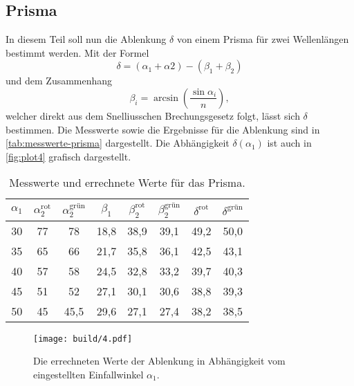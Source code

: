 \subsection{Prisma}
\label{sec:Prisma}
In diesem Teil soll nun die Ablenkung $\delta$ von einem Prisma für zwei Wellenlängen
bestimmt werden. Mit der Formel
\begin{equation}
	\delta = (\alpha_1 + \alpha2) - (\beta_1 + \beta_2)
\end{equation}
und dem Zusammenhang
\begin{equation}
	\beta_i = \arcsin\left(\frac{\sin\alpha_i}{n}\right),
\end{equation}
welcher direkt aus dem Snelliusschen Brechungsgesetz folgt, lässt sich $\delta$ bestimmen.
Die Messwerte sowie die Ergebnisse für die Ablenkung sind in \autoref{tab:messwerte-prisma}
dargestellt. Die Abhängigkeit $\delta(\alpha_1)$ ist auch in \autoref{fig:plot4} grafisch
dargestellt.
\begin{table}
	\centering
	\caption{Messwerte und errechnete Werte für das Prisma.}
	\label{tab:messwerte-prisma}
	\begin{tabular}{c c c c c c c c}
		\toprule
		$\alpha_1$ &
		$\alpha_2^\text{rot}$ &
		$\alpha_2^\text{grün}$ &
		$\beta_1$ &
		$\beta_2^\text{rot}$ &
		$\beta_2^\text{grün}$ &
		$\delta^\text{rot}$ &
		$\delta^\text{grün}$ \\
		\midrule
		30 & 77 & 78   & 18,8 & 38,9 & 39,1 & 49,2 & 50,0	\\
		35 & 65 & 66   & 21,7 & 35,8 & 36,1 & 42,5 & 43,1	\\
		40 & 57 & 58   & 24,5 & 32,8 & 33,2 & 39,7 & 40,3	\\
		45 & 51 & 52   & 27,1 & 30,1 & 30,6 & 38,8 & 39,3	\\
		50 & 45 & 45,5 & 29,6 & 27,1 & 27,4 & 38,2 & 38,5	\\
		\bottomrule
	\end{tabular}
\end{table}
\begin{figure}[H]
	\centering
	\texttt{[image: build/4.pdf]}
	\caption{Die errechneten Werte der Ablenkung in Abhängigkeit vom eingestellten
	Einfallwinkel $\alpha_1$.}
	\label{fig:plot4}
\end{figure}

